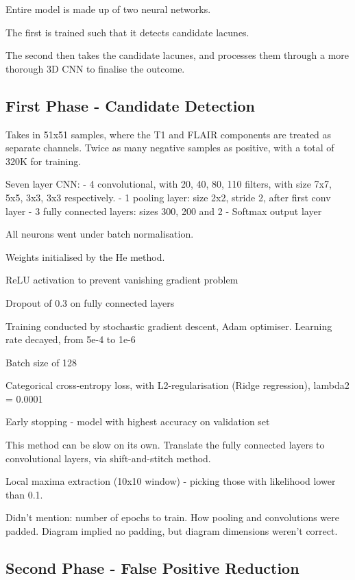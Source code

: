 Entire model is made up of two neural networks.

The first is trained such that it detects candidate lacunes.

The second then takes the candidate lacunes, and processes them through a more thorough 3D CNN to finalise the outcome.

\subsection{First Phase - Candidate Detection}

Takes in 51x51 samples, where the T1 and FLAIR components are treated as separate channels. Twice as many negative samples as positive, with a total of 320K for training.

Seven layer CNN:
- 4 convolutional, with 20, 40, 80, 110 filters, with size 7x7, 5x5, 3x3, 3x3 respectively.
- 1 pooling layer: size 2x2, stride 2, after first conv layer
- 3 fully connected layers: sizes 300, 200 and 2
- Softmax output layer

All neurons went under batch normalisation.

Weights initialised by the He method.

ReLU activation to prevent vanishing gradient problem

Dropout of 0.3 on fully connected layers

Training conducted by stochastic gradient descent, Adam optimiser. Learning rate decayed, from 5e-4 to 1e-6

Batch size of 128

Categorical cross-entropy loss, with L2-regularisation (Ridge regression), lambda2 = 0.0001

Early stopping - model with highest accuracy on validation set


This method can be slow on its own. Translate the fully connected layers to convolutional layers, via shift-and-stitch method.

Local maxima extraction (10x10 window) - picking those with likelihood lower than 0.1.


Didn't mention: number of epochs to train. How pooling and convolutions were padded. Diagram implied no padding, but diagram dimensions weren't correct. 

\subsection{Second Phase - False Positive Reduction}

